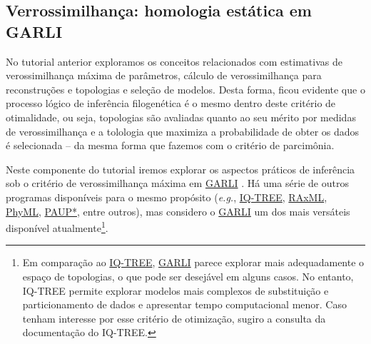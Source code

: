 \newpage
\pagestyle{fancy} %
\begin{refsection}
\renewcommand*{\finalnamedelim}{\addspace\&\space} %
%
\newcommand{\A}{\textcolor{green}{\textbf{A}}}
\newcommand{\C}{\textcolor{blue}{\textbf{C}}}
\newcommand{\G}{\textcolor{gray}{\textbf{G}}}
\newcommand{\T}{\textcolor{red}{\textbf{T}}}
\newcommand{\gap}{\textcolor{black}{\textbf{-}}}



\section{Verrossimilhança: homologia estática em GARLI}\label{tut13:static}
No tutorial anterior exploramos os conceitos relacionados com estimativas de verossimilhança máxima de parâmetros, cálculo de verossimilhança para reconstruções e topologias e seleção de modelos. Desta forma, ficou evidente que o processo lógico de inferência filogenética é o mesmo dentro deste critério de otimalidade, ou seja, topologias são avaliadas quanto ao seu mérito por medidas de verossimilhança e a tolologia que maximiza a probabilidade de obter os dados é selecionada -- da mesma forma que fazemos com o critério de parcimônia.

Neste componente do tutorial iremos explorar os aspectos práticos de inferência sob o critério de verossimilhança máxima em \href{https://code.google.com/archive/p/garli/}{GARLI} \parencite[][]{Zwickl_2006}. Há uma série de outros programas disponíveis para o mesmo propósito (\textit{e.g.}, \href{http://www.iqtree.org/}{IQ-TREE}, \href{http://sco.h-its.org/exelixis/web/software/raxml/index.html}{RAxML}, \href{http://www.atgc-montpellier.fr/phyml/}{PhyML}, \href{http://paup.csit.fsu.edu/downl.html}{PAUP*}, entre outros), mas considero o \href{https://www.nescent.org/wg_garli/Main_Page}{GARLI} um dos mais versáteis disponível atualmente\footnote{Em comparação ao \href{http://www.iqtree.org/}{IQ-TREE}, \href{https://code.google.com/archive/p/garli/}{GARLI} parece explorar mais adequadamente o espaço de topologias, o que pode ser desejável em alguns casos. No entanto, IQ-TREE permite explorar modelos mais complexos de substituição e particionamento de dados e apresentar tempo computacional menor. Caso tenham interesse por esse critério de otimização, sugiro a consulta da documentação do IQ-TREE.}. 


\end{refsection}

